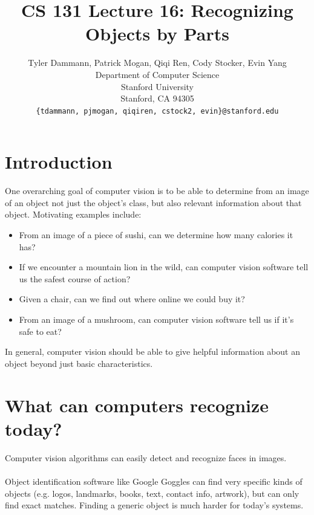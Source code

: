 \documentclass[11pt]{article}
\title{CS 131 Lecture 16: Recognizing Objects by Parts}
\author{
  Tyler Dammann, Patrick Mogan, Qiqi Ren, Cody Stocker, Evin Yang \\
  Department of Computer Science\\
  Stanford University\\
  Stanford, CA 94305 \\
  \texttt{\{tdammann, pjmogan, qiqiren, cstock2, evin\}@stanford.edu} \\
}
\begin{document}
\maketitle
\section{Introduction}
One overarching goal of computer vision is to be able to determine from an image of an object not just the object's class, but also relevant information about that object. Motivating examples include:
 \begin{itemize}
   \item From an image of a piece of sushi, can we determine how many calories it has?
   \item If we encounter a mountain lion in the wild, can computer vision software tell us the safest course of action?
   \item Given a chair, can we find out where online we could buy it?
   \item From an image of a mushroom, can computer vision software tell us if it's safe to eat?
 \end{itemize}
In general, computer vision should be able to give helpful information about an object beyond just basic characteristics.
\section{What can computers recognize today?}
Computer vision algorithms can easily detect and recognize faces in images.\\ \\
Object identification software like Google Goggles can find very specific kinds of objects (e.g. logos, landmarks, books, text, contact info, artwork), but can only find exact matches. Finding a generic object is much harder for today's systems.
\end{document}
